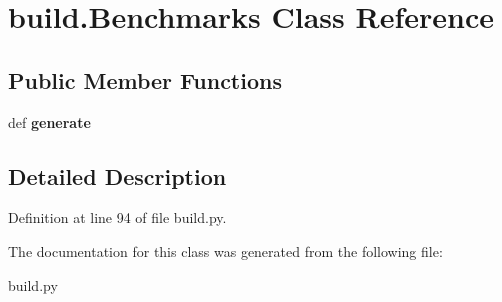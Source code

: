\hypertarget{classbuild_1_1Benchmarks}{\section{build.\-Benchmarks \-Class \-Reference}
\label{classbuild_1_1Benchmarks}
}
\subsection*{\-Public \-Member \-Functions}
\begin{DoxyCompactItemize}
\item 
\hypertarget{classbuild_1_1Benchmarks_a90444b5ee86805be3194ec86e41ee0a9}{def {\bfseries generate}}\label{classbuild_1_1Benchmarks_a90444b5ee86805be3194ec86e41ee0a9}

\end{DoxyCompactItemize}


\subsection{\-Detailed \-Description}


\-Definition at line 94 of file build.\-py.



\-The documentation for this class was generated from the following file\-:\begin{DoxyCompactItemize}
\item 
build.\-py\end{DoxyCompactItemize}
